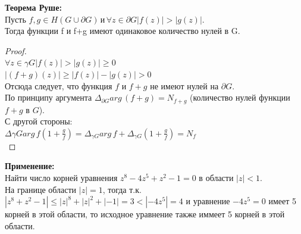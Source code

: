 \textbf{Теорема Руше:}\\
Пусть $f,g \in H(G \cup \partial G) \, \textrm{и} \, \forall z \in \partial G |f(z)| > |g(z)|$. \\
Тогда функции f и f+g имеют одинаковое количество нулей в G.\\[2mm]

\begin{proof}
    \ \\
    $\forall z \in \gamma G |f(z)|>|g(z)|\geq 0$\\
    $|(f+g)(z)|\geq |f(z)|-|g(z)| > 0$\\
    Отсюда следует, что функция $f$ и $f+g$ не имеют нулей на $\partial G$.\\
    По принципу аргумента $\Delta_{\partial G}arg\, (f+g) = N_{f+g}$ (количество нулей функции $f+g$ в $G$).\\
    С другой стороны:\\
    $\Delta \gamma G arg\, f(1+\frac{g}{f})=\Delta_{\gamma G} arg\, f+\Delta_{\gamma G}(1+\frac{g}{f})=N_f$\\
    
\end{proof}
\textbf{Применение:}\\
Найти число корней уравнения $z^8-4z^5+z^2-1=0$ в области $|z|<1$.\\
На границе области $|z|=1$, тогда т.к. $|z^8+z^2-1|\leq |z|^8+|z|^2+|-1|=3 < |-4z^5|=4$ и уравнение $-4z^5=0$ имеет 5 корней в этой области, то исходное уравнение также иммеет 5 корней в этой области.